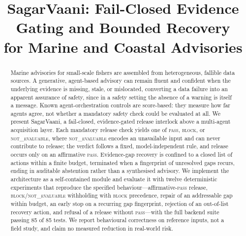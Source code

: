 \documentclass[conference]{IEEEtran}
\newcommand{\NE}{\textsc{not\_evaluable}}
\newcommand{\PASS}{\textsc{pass}}
\newcommand{\BLOCK}{\textsc{block}}
\begin{document}
\title{SagarVaani: Fail-Closed Evidence Gating and Bounded Recovery\\ for Marine and Coastal Advisories}

\author{
\and
{}
}

\maketitle

\begin{abstract}
Marine advisories for small-scale fishers are assembled from heterogeneous, fallible data sources. A generative, agent-based advisory can remain fluent and confident when the underlying evidence is missing, stale, or mislocated, converting a data failure into an apparent assurance of safety, since in a safety setting the absence of a warning is itself a message. Known agent-orchestration controls are score-based: they measure how far agents agree, not whether a mandatory safety check could be evaluated at all. We present SagarVaani, a fail-closed, evidence-gated release interlock above a multi-agent acquisition layer. Each mandatory release check yields one of \PASS{}, \BLOCK{}, or \NE{}, where \NE{} encodes an unavailable input and can never contribute to release; the verdict follows a fixed, model-independent rule, and release occurs only on an affirmative \PASS{}. Evidence-gap recovery is confined to a closed list of actions within a finite budget, terminated when a fingerprint of unresolved gaps recurs, ending in auditable abstention rather than a synthesised advisory. We implement the architecture as a self-contained module and evaluate it with twelve deterministic experiments that reproduce the specified behaviour---affirmative-\PASS{} release, \BLOCK{}/\NE{} withholding with \BLOCK{} precedence, repair of an addressable gap within budget, an early stop on a recurring gap fingerprint, rejection of an out-of-list recovery action, and refusal of a release without \PASS{}---with the full backend suite passing 85 of 85 tests. We report behavioural correctness on reference inputs, not a field study, and claim no measured reduction in real-world risk.
\end{abstract}
\end{document}
